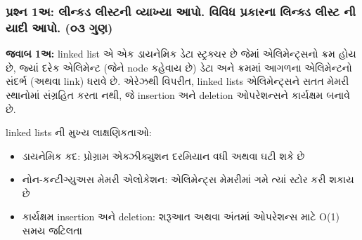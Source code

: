 \documentclass[]{article}
\providecommand{\tightlist}{%
  \setlength{\itemsep}{0pt}\setlength{\parskip}{0pt}}
\begin{document}
\hypertarget{uxaaauxab0uxab6uxaa8-1uxa85-uxab2uxaa8uxa95uxaa1-uxab2uxab8uxa9fuxaa8-uxab5uxaafuxa96uxaaf-uxa86uxaaa.-uxab5uxab5uxaa7-uxaaauxab0uxa95uxab0uxaa8-uxab2uxaa8uxa95uxaa1-uxab2uxab8uxa9f-uxaa8-uxaafuxaa6-uxa86uxaaa.-uxae6uxae9-uxa97uxaa3}{%
\subsubsection{\texorpdfstring{\textgujarati{પ્રશ્ન} 1\textgujarati{અ}:
\textgujarati{લીન્કડ} \textgujarati{લીસ્ટની} \textgujarati{વ્યાખ્યા}
\textgujarati{આપો}. \textgujarati{વિવિધ} \textgujarati{પ્રકારના}
\textgujarati{લિન્ક્ડ} \textgujarati{લીસ્ટ} \textgujarati{ની}
\textgujarati{યાદી} \textgujarati{આપો}. (\textgujarati{૦૩}
\textgujarati{ગુણ})}{ 1:    .       . ( )}}\label{uxaaauxab0uxab6uxaa8-1uxa85-uxab2uxaa8uxa95uxaa1-uxab2uxab8uxa9fuxaa8-uxab5uxaafuxa96uxaaf-uxa86uxaaa.-uxab5uxab5uxaa7-uxaaauxab0uxa95uxab0uxaa8-uxab2uxaa8uxa95uxaa1-uxab2uxab8uxa9f-uxaa8-uxaafuxaa6-uxa86uxaaa.-uxae6uxae9-uxa97uxaa3}}

\textbf{\textgujarati{જવાબ} 1\textgujarati{અ}:} linked list
\textgujarati{એ} \textgujarati{એક} \textgujarati{ડાયનેમિક}
\textgujarati{ડેટા} \textgujarati{સ્ટ્રક્ચર} \textgujarati{છે}
\textgujarati{જેમાં} \textgujarati{એલિમેન્ટ્સનો} \textgujarati{ક્રમ}
\textgujarati{હોય} \textgujarati{છે}, \textgujarati{જ્યાં}
\textgujarati{દરેક} \textgujarati{એલિમેન્ટ} (\textgujarati{જેને} node
\textgujarati{કહેવાય} \textgujarati{છે}) \textgujarati{ડેટા}
\textgujarati{અને} \textgujarati{ક્રમમાં} \textgujarati{આગળના}
\textgujarati{એલિમેન્ટનો} \textgujarati{સંદર્ભ} (\textgujarati{અથવા} link)
\textgujarati{ધરાવે} \textgujarati{છે}. \textgujarati{એરેઝથી}
\textgujarati{વિપરીત}, linked lists \textgujarati{એલિમેન્ટ્સને}
\textgujarati{સતત} \textgujarati{મેમરી} \textgujarati{સ્થાનોમાં}
\textgujarati{સંગ્રહિત} \textgujarati{કરતા} \textgujarati{નથી},
\textgujarati{જે} insertion \textgujarati{અને} deletion
\textgujarati{ઓપરેશન્સને} \textgujarati{કાર્યક્ષમ} \textgujarati{બનાવે}
\textgujarati{છે}.

linked lists \textgujarati{ની} \textgujarati{મુખ્ય}
\textgujarati{લાક્ષણિકતાઓ}:

\begin{itemize}
\tightlist
\item
  \textgujarati{ડાયનેમિક} \textgujarati{કદ}: \textgujarati{પ્રોગ્રામ}
  \textgujarati{એક્ઝીક્યુશન} \textgujarati{દરમિયાન} \textgujarati{વધી}
  \textgujarati{અથવા} \textgujarati{ઘટી} \textgujarati{શકે}
  \textgujarati{છે}
\item
  \textgujarati{નોન}-\textgujarati{કન્ટીગ્યુઅસ} \textgujarati{મેમરી}
  \textgujarati{એલોકેશન}: \textgujarati{એલિમેન્ટ્સ} \textgujarati{મેમરીમાં}
  \textgujarati{ગમે} \textgujarati{ત્યાં} \textgujarati{સ્ટોર}
  \textgujarati{કરી} \textgujarati{શકાય} \textgujarati{છે}
\item
  \textgujarati{કાર્યક્ષમ} insertion \textgujarati{અને} deletion:
  \textgujarati{શરૂઆત} \textgujarati{અથવા} \textgujarati{અંતમાં}
  \textgujarati{ઓપરેશન્સ} \textgujarati{માટે} O(1) \textgujarati{સમય}
  \textgujarati{જટિલતા}
\end{itemize}
\end{document}
